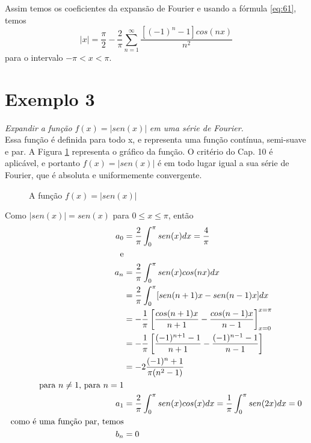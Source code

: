 Assim temos os coeficientes da expansão de Fourier e usando a fórmula \ref{eq:61}, temos
\begin{equation}
\label{eq:exemplo2SF}
    |x| = \dfrac{\pi}{2} - \dfrac{2}{\pi}\sum\limits_{n=1}^{\infty} \dfrac{[(-1)^n - 1]cos(nx)}{n^2}
\end{equation}
para o intervalo $ -\pi < x < \pi$.

\section*{Exemplo 3}
\textit{Expandir a função }$f(x) = |sen(x)|$\textit{ em uma série de Fourier.}\\

Essa função é definida para todo x, e representa uma função contínua, semi-suave e par. 
A Figura \ref{fig:exemplo3} representa o gráfico da função. O critério do Cap. 10 é 
aplicável, e portanto $f(x) = |sen(x)|$ é em todo lugar igual a sua série de Fourier,
que é absoluta e uniformemente convergente.

\begin{figure}[H]

    \caption{A função $f(x) = |sen(x)|$}
    \label{fig:exemplo3}
\end{figure}

Como $|sen(x)| = sen(x)$ para $0 \leq x \leq \pi$, então
\begin{equation}
    \notag
    \begin{split}
        a_0 &= \dfrac{2}{\pi} \int_{0}^{\pi}sen(x)dx = \dfrac{4}{\pi}\\
        \text{e}&\\
        a_n &= \dfrac{2}{\pi}\int_{0}^{\pi}sen(x)cos(nx)dx\\
        &= \dfrac{2}{\pi}\int_{0}^{\pi}[sen(n + 1)x - sen(n - 1)x]dx\\
        &= -\dfrac{1}{\pi}\left[\dfrac{cos(n+1)x}{n+1} - \dfrac{cos(n - 1)x}{n - 1}\right]_{x=0}^{x=\pi}\\
        &= -\dfrac{1}{\pi}\left[\dfrac{(-1)^{n+1}-1}{n+1} - \dfrac{(-1)^{n-1}-1}{n - 1}\right]\\
        &= -2\dfrac{(-1)^n + 1}{\pi(n^2 -1)}\\
        \text{para }n \neq 1\text{, para }n=1 &\\
        a_1 &= \dfrac{2}{\pi}\int_{0}^{\pi}sen(x)cos(x)dx =\dfrac{1}{\pi}\int_{0}^{\pi}sen(2x)dx = 0\\
        \text{como é uma função par, temos}&\\
        b_n &= 0
    \end{split} 
\end{equation}

